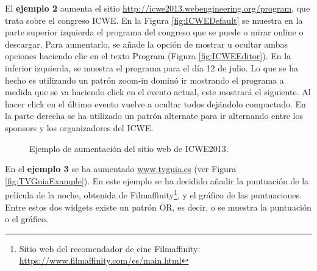 El \textbf{ejemplo 2} aumenta el sitio \url{http://icwe2013.webengineering.org/program}, que trata sobre el congreso ICWE. En la Figura \ref{fig:ICWEDefault} se muestra en la parte superior izquierda el programa del congreso que se puede o mirar online o descargar. Para aumentarlo, se añade la opción de mostrar u ocultar ambas opciones haciendo clic en el texto Program (Figura \ref{fig:ICWEEditor}). En la inferior izquierda, se muestra el programa para el día 12 de julio. Lo que se ha hecho es utilizando un patrón zoom-in dominó ir mostrando el programa a medida que se va haciendo click en el evento actual, este mostrará el siguiente. Al hacer click en el último evento vuelve a ocultar todos dejándolo compactado. En la parte derecha se ha utilizado un patrón alternate para ir alternando entre los sponsors y los organizadores del ICWE.

\begin{figure}
\centering
{}
\caption{Ejemplo de aumentación del sitio web de ICWE2013.}
\label{fig:ICWEExample}
\end{figure}

En el \textbf{ejemplo 3} se ha aumentado \url{www.tvguia.es} (ver Figura \ref{fig:TVGuiaExample}). En este ejemplo se ha decidido añadir la puntuación de la película de la noche, obtenida de Filmaffinity\footnote{Sitio web del recomendador de cine Filmaffinity: \url{https://www.filmaffinity.com/es/main.html}}, y el gráfico de las puntuaciones. Entre estos dos widgets existe un patrón OR, es decir, o se muestra la puntuación o el gráfico.

